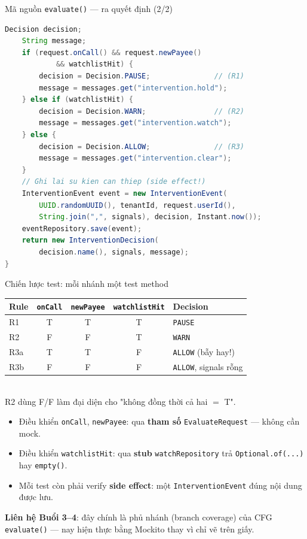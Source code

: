 \documentclass[aspectratio=169,12pt]{beamer}
\begin{document}
\begin{frame}[fragile]{Mã nguồn \texttt{evaluate()} --- ra quyết định (2/2)}
\begin{lstlisting}[language=java,basicstyle=\ttfamily\scriptsize]
    Decision decision;
    String message;
    if (request.onCall() && request.newPayee()
            && watchlistHit) {
        decision = Decision.PAUSE;               // (R1)
        message = messages.get("intervention.hold");
    } else if (watchlistHit) {
        decision = Decision.WARN;                // (R2)
        message = messages.get("intervention.watch");
    } else {
        decision = Decision.ALLOW;               // (R3)
        message = messages.get("intervention.clear");
    }
    // Ghi lai su kien can thiep (side effect!)
    InterventionEvent event = new InterventionEvent(
        UUID.randomUUID(), tenantId, request.userId(),
        String.join(",", signals), decision, Instant.now());
    eventRepository.save(event);
    return new InterventionDecision(
        decision.name(), signals, message);
}
\end{lstlisting}
\end{frame}

\begin{frame}{Chiến lược test: mỗi nhánh một test method}
  \begin{center}
  \footnotesize
  \begin{tabular}{lcccl}
    \toprule
    \textbf{Rule} & \texttt{onCall} & \texttt{newPayee} & \texttt{watchlistHit} & \textbf{Decision} \\
    \midrule
    R1 & T & T & T & \texttt{PAUSE} \\
    R2 & F & F & T & \texttt{WARN} \\
    R3a & T & T & F & \texttt{ALLOW} (bẫy hay!) \\
    R3b & F & F & F & \texttt{ALLOW}, signals rỗng \\
    \bottomrule
  \end{tabular}\\[0em]
  {\scriptsize R2 dùng F/F làm đại diện cho "không đồng thời cả hai $=$ T".}
  \end{center}

  \begin{itemize}
    \item Điều khiển \texttt{onCall}, \texttt{newPayee}: qua \textbf{tham số}
      \texttt{EvaluateRequest} --- không cần mock.
    \item Điều khiển \texttt{watchlistHit}: qua \textbf{stub}
      \texttt{watchRepository} trả \texttt{Optional.of(...)} hay \texttt{empty()}.
    \item Mỗi test còn phải verify \textbf{side effect}: một
      \texttt{InterventionEvent} đúng nội dung được lưu.
  \end{itemize}

  {\small \textbf{Liên hệ Buổi 3--4}: đây chính là phủ nhánh (branch coverage)
  của CFG \texttt{evaluate()} --- nay hiện thực bằng Mockito thay vì chỉ vẽ
  trên giấy.}
\end{frame}
\end{document}
